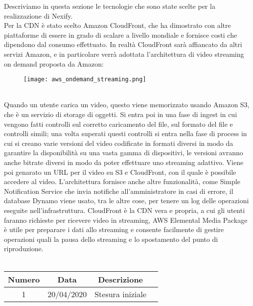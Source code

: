 Descriviamo in questa sezione le tecnologie che sono state scelte per la realizzazione di Nexify.\\
Per la CDN è stato scelto Amazon CloudFront, che ha dimostrato con altre piattaforme di essere in grado di scalare a livello mondiale e fornisce costi che dipendono dal consumo effettuato. In realtà CloudFront sarà affiancato da altri servizi Amazon, e in particolare verrà adottata l'architettura di video streaming on demand proposta da Amazon:\\
\begin{figure}[!h]
\centering
\texttt{[image: aws\_ondemand\_streaming.png]}
\end{figure}\\
Quando un utente carica un video, questo viene memorizzato usando Amazon S3, che è un servizio di storage di oggetti. Si entra poi in una fase di ingest in cui vengono fatti controlli sul corretto caricamento del file, sul formato del file e controlli simili; una volta superati questi controlli si entra nella fase di process in cui si creano varie versioni del video codificate in formati diversi in modo da garantire la disponibilità su una vasta gamma di dispositivi, le versioni avranno anche bitrate diversi in modo da poter effettuare uno streaming adattivo. Viene poi genarato un URL per il video su S3 e CloudFront, con il quale è possibile accedere al video. L'architettura fornisce anche altre funzionalità, come Simple Notification Service che invia notifiche all'amministratore in casi di errore, il database Dynamo viene usato, tra le altre cose, per tenere un log delle operazioni eseguite nell'infrastruttura. CloudFront è la CDN vera e propria, a cui gli utenti faranno richieste per ricevere video in streaming, AWS Elemental Media Package è utile per preparare i dati allo streaming e consente facilmente di gestire operazioni quali la pausa dello streaming e lo spostamento del punto di riproduzione.
\newline\newline
{} \\ \\
\begin{tabular}{|c | c | c | c|} 
 	\hline
	 Numero & Data & Descrizione \\ [0.5ex] 
	\hline\hline
	1 & 20/04/2020 & Stesura iniziale \\ 
	\hline
\end{tabular}